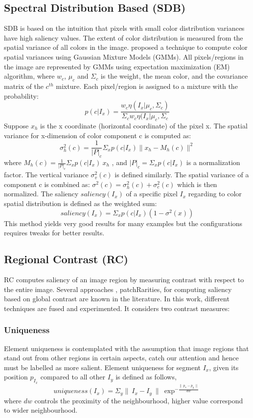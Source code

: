 \subsection{Spectral Distribution Based (SDB)} 
SDB is based on the intuition that pixels with small color distribution variances have high saliency values.  The extent of color distribution is measured from the spatial variance of all colors in the image.  \cite{spectralSal} proposed a technique to compute color spatial variances using Gaussian Mixture Models (GMMs).  All pixels/regions in the image are represented by GMMs using expectation maximization (EM) algorithm, where $w_{c}$, $\mu_{c}$ and $\Sigma_{c}$ is the weight, the mean color, and the covariance matrix of the $c^{th}$ mixture. Each pixel/region is assigned to a mixture with the probability:
$$p(c | I_{x}) = \frac{w_{c}\eta(I_{x}| \mu_{c},\Sigma_{c})}{\Sigma_{c}w_{c}\eta(I_{x}| \mu_{c},\Sigma_{c}} $$
Suppose $x_{h}$ is the x coordinate (horizontal coordinate) of the pixel x. The spatial variance for x-dimension of color component c is computed as:
$$\sigma_{h}^{2}(c) = \frac{1}{|P|_{c}}\Sigma_{x}	p(c | I_{x}) \parallel x_{h} -M_{h}(c) \parallel^{2}$$
where $M_{h}(c) = \frac{1}{|P|_{c}}\Sigma_{x}p(c|I_{x})~x_h$ , and $|P|_{c} = \Sigma_{x}p(c | I_{x})$ is a normalization factor.  The vertical variance $\sigma_{v}^{2}(c)$ is defined similarly.  The spatial variance of a component c is combined as: $\sigma^{2}(c) = \sigma_{h}^{2}(c) + \sigma_{c}^{2}(c)$ which is then normalized.
The saliency $saliency(I_{x})$ of a specific pixel $I_{x}$ regarding to color spatial distribution is defined as the weighted sum:
$$saliency(I_{x}) = \Sigma_{x}p(c | I_{x})(1-\sigma^{2}(x))$$
This method yields very good results for many examples but the configurations requires tweaks for better results.

\subsection{Regional Contrast (RC)}
RC computes saliency of an image region by measuring contrast with respect to the entire image. Several approaches  \citep{globContrast}, {patchRarities}, \citep{salFilters} for computing saliency based on global contrast are known in the literature.  In this work, different techniques are fused and experimented.  It considers two contrast measures:
\subsubsection{Uniqueness}
Element uniqueness is contemplated with the assumption that image regions that stand out from other regions in certain aspects, catch our attention and hence must be labelled as more salient.  Element uniqueness for segment $I_{x}$, given its position $p_{I_{x}}$ compared to all other $I_{y}$ is defined as follows,
$$uniqueness(I_{x}) = \Sigma_{y} \parallel~I_{x} -I_{y}~\parallel~\exp^{-\frac{\parallel~p_{x} - p_{y}~\parallel}{dw}}$$
where $dw$ controls the proximity of the neighbourhood, higher value correspond to wider neighbourhood.
